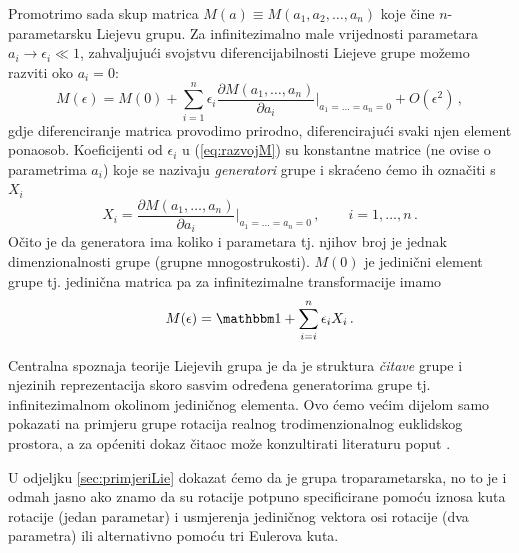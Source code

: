 Promotrimo sada skup matrica $M(a)\equiv M(a_1, a_2, \ldots, a_n)$ koje
čine $n$-pa\-ra\-me\-tar\-sku Liejevu grupu.
Za infinitezimalno male vrijednosti parametara $a_i \to \epsilon_i \ll 1$, zahvaljujući
svojstvu diferencijabilnosti Liejeve grupe možemo razviti oko $a_i = 0$:
\begin{equation}
   M(\epsilon)=M(0)+ \sum_{i=1}^{n}\epsilon_i \frac{\partial M(a_1, \ldots, a_n)}
 {\partial a_i}\Bigg|_{a_1=\ldots =a_n=0} + O(\epsilon^2) \,,
 \label{eq:razvojM}
\end{equation}
gdje diferenciranje matrica provodimo prirodno, diferencirajući svaki njen
element ponaosob. Koeficijenti od $\epsilon_i$ u (\ref{eq:razvojM}) su
konstantne matrice (ne ovise o parametrima $a_i$) koje se nazivaju \emph{generatori} grupe
 
i skraćeno ćemo ih označiti s $X_i$
\begin{equation}
X_i =  \frac{\partial M(a_1, \ldots, a_n)}
 {\partial a_i}\Bigg|_{a_1=\ldots =a_n=0}\,, \quad 
   \quad i=1, \ldots, n\,. 
   \label{eq:defXi}
\end{equation}
Očito je da generatora ima koliko i parametara tj. njihov broj je jednak
dimenzionalnosti grupe (grupne mnogostrukosti).  $M(0)$ je jedinični
element grupe tj. jedinična matrica pa za infinitezimalne transformacije imamo
\begin{equation}
  M(\epsilon)=\Eins + \sum_{i=i}^{n}\epsilon_i X_i \,. 
\end{equation}

Centralna spoznaja teorije Liejevih grupa je da je struktura \emph{čitave} grupe i
njezinih reprezentacija skoro sasvim određena
generatorima grupe tj. infinitezimalnom okolinom jediničnog 
elementa.
Ovo ćemo većim dijelom samo pokazati na primjeru grupe rotacija realnog
trodimenzionalnog euklidskog prostora, a za općeniti
dokaz čitaoc može konzultirati literaturu poput \cite{Stilwell:2008}.


U odjeljku \ref{sec:primjeriLie} dokazat ćemo da je grupa  troparametarska,
no to je i odmah jasno ako znamo da su rotacije potpuno specificirane pomoću
iznosa kuta rotacije (jedan parametar) i usmjerenja jediničnog vektora osi rotacije (dva parametra)
ili alternativno pomoću tri Eulerova kuta. 

